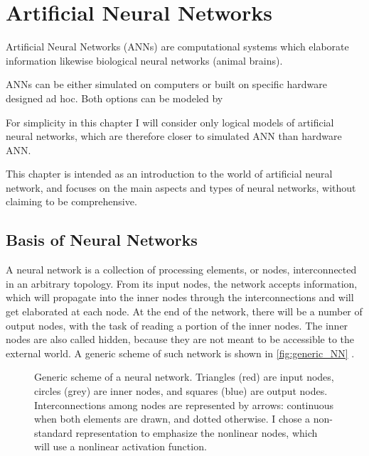 \chapter{Artificial Neural Networks}
\label{ch:Artificial_Neural_Networks}

Artificial Neural Networks (ANNs) are computational systems which elaborate information likewise biological neural networks (animal brains).


\vspace{1em}
ANNs can be either simulated on computers or built on specific hardware designed ad hoc.
Both options can be modeled by 

\vspace{1em}
For simplicity in this chapter I will consider only logical models of artificial neural networks, which are therefore closer to simulated ANN than hardware ANN.


This chapter is intended as an introduction to the world of artificial neural network, and focuses on the main aspects and types of neural networks, without claiming to be comprehensive.

\section{Basis of Neural Networks}
\label{sec:Basis_of_Neural_Networks}

A neural network is a collection of processing elements, or nodes, interconnected in an arbitrary topology.
From its input nodes, the network accepts information, which will propagate into the inner nodes through the interconnections and will get elaborated at each node.
At the end of the network, there will be a number of output nodes, with the task of reading a portion of the inner nodes.
The inner nodes are also called hidden, because they are not meant to be accessible to the external world.
A generic scheme of such network is shown in \autoref{fig:generic_NN} .

\begin{figure}[ht]
	\centering
	
	\caption{	Generic scheme of a neural network. %
						Triangles (red) are input nodes, circles (grey) are inner nodes, and squares (blue) are output nodes. %
						Interconnections among nodes are represented by arrows: %
						continuous when both elements are drawn, and dotted otherwise. %
						I chose a non-standard representation to emphasize the nonlinear nodes, which will use a nonlinear activation function. %
						}
	\label{fig:generic_NN}
\end{figure}

